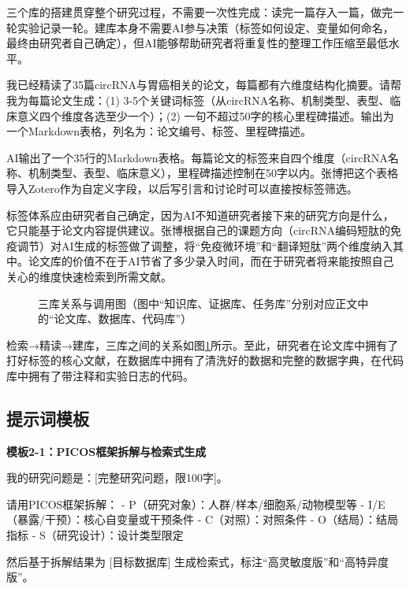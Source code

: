 三个库的搭建贯穿整个研究过程，不需要一次性完成：读完一篇存入一篇，做完一轮实验记录一轮。建库本身不需要AI参与决策（标签如何设定、变量如何命名，最终由研究者自己确定），但AI能够帮助研究者将重复性的整理工作压缩至最低水平。

\smallskip
\begin{userbox}
我已经精读了35篇circRNA与胃癌相关的论文，每篇都有六维度结构化摘要。请帮我为每篇论文生成：(1) 3-5个关键词标签（从circRNA名称、机制类型、表型、临床意义四个维度各选至少一个）；(2) 一句不超过50字的核心里程碑描述。输出为一个Markdown表格，列名为：论文编号、标签、里程碑描述。
\end{userbox}

\begin{aibox}
AI输出了一个35行的Markdown表格。每篇论文的标签来自四个维度（circRNA名称、机制类型、表型、临床意义），里程碑描述控制在50字以内。张博把这个表格导入Zotero作为自定义字段，以后写引言和讨论时可以直接按标签筛选。
\end{aibox}

\begin{critiquebox}
标签体系应由研究者自己确定，因为AI不知道研究者接下来的研究方向是什么，它只能基于论文内容提供建议。张博根据自己的课题方向（circRNA编码短肽的免疫调节）对AI生成的标签做了调整，将``免疫微环境''和``翻译短肽''两个维度纳入其中。论文库的价值不在于AI节省了多少录入时间，而在于研究者将来能按照自己关心的维度快速检索到所需文献。
\end{critiquebox}

\begin{figure}[H]
\centering
{}
\caption{三库关系与调用图（图中``知识库、证据库、任务库''分别对应正文中的``论文库、数据库、代码库''）}
\label{fig:ch5_04}
\end{figure}
\par

检索→精读→建库，三库之间的关系如图\ref{fig:ch5_04}所示。至此，研究者在论文库中拥有了打好标签的核心文献，在数据库中拥有了清洗好的数据和完整的数据字典，在代码库中拥有了带注释和实验日志的代码。


\subsection*{提示词模板}

\textbf{模板2-1：PICOS框架拆解与检索式生成}

\begin{tcolorbox}[promptbox]
我的研究问题是：[完整研究问题，限100字]。

请用PICOS框架拆解：
- P（研究对象）：人群/样本/细胞系/动物模型等
- I/E（暴露/干预）：核心自变量或干预条件
- C（对照）：对照条件
- O（结局）：结局指标
- S（研究设计）：设计类型限定

然后基于拆解结果为 [目标数据库] 生成检索式，标注``高灵敏度版''和``高特异度版''。
\end{tcolorbox}

